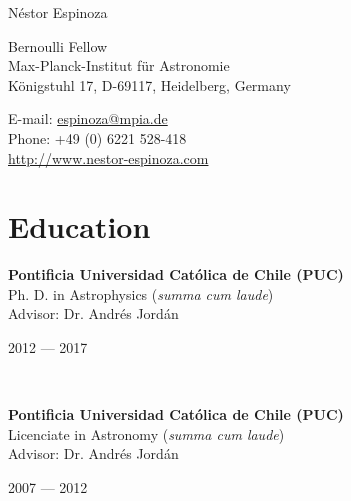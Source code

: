\documentclass[11pt, a4paper]{article} %
\begin{document}

{\LARGE N\'estor Espinoza}\\[0.2cm] %
\begin{minipage}[t]{0.63\textwidth}
Bernoulli Fellow\\
Max-Planck-Institut f\"ur Astronomie\\
K\"onigstuhl 17, D-69117, Heidelberg, Germany \\
\end{minipage}
\begin{minipage}[t]{0.37\textwidth}
E-mail: \href{mailto:espinoza@mpia.de}{espinoza@mpia.de}\\
Phone: +49 (0) 6221 528-418\\ 
\url{http://www.nestor-espinoza.com}
\end{minipage}

\hrulefill
\section*{Education}


\begin{minipage}[t]{0.6\textwidth}
\begin{flushleft}%
  \setlength{\leftskip}{0.2cm}%
\textbf{Pontificia Universidad Cat\'olica de Chile (PUC)}\\
Ph. D. in Astrophysics (\textit{summa cum laude})\\
Advisor: Dr. Andr\'es Jord\'an
 
\end{flushleft}
\end{minipage}
\begin{minipage}[t]{0.4\textwidth}
\hfill 2012 --- 2017 
\end{minipage}\\

\begin{minipage}[t]{0.6\textwidth}
\begin{flushleft}%
  \setlength{\leftskip}{0.2cm}%
\textbf{Pontificia Universidad Cat\'olica de Chile (PUC)}\\
 Licenciate in Astronomy (\textit{summa cum laude})\\
 Advisor: Dr. Andr\'es Jord\'an
 \end{flushleft}
\end{minipage}
\begin{minipage}[t]{0.4\textwidth}
\hfill 2007 --- 2012 
\end{minipage}
\end{document}
